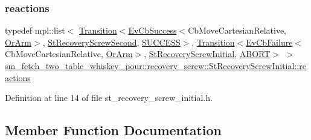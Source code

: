 \subsubsection{\texorpdfstring{reactions}{reactions}}
{\footnotesize\ttfamily typedef mpl\+::list$<$ \hyperlink{classsmacc_1_1Transition}{Transition}$<$\hyperlink{structsmacc_1_1EvCbSuccess}{Ev\+Cb\+Success}$<$Cb\+Move\+Cartesian\+Relative, \hyperlink{classsm__fetch__two__table__whiskey__pour_1_1OrArm}{Or\+Arm}$>$, \hyperlink{structsm__fetch__two__table__whiskey__pour_1_1recovery__screw_1_1StRecoveryScrewSecond}{St\+Recovery\+Screw\+Second}, \hyperlink{structsmacc_1_1default__transition__tags_1_1SUCCESS}{S\+U\+C\+C\+E\+SS}$>$, \hyperlink{classsmacc_1_1Transition}{Transition}$<$\hyperlink{structsmacc_1_1EvCbFailure}{Ev\+Cb\+Failure}$<$Cb\+Move\+Cartesian\+Relative, \hyperlink{classsm__fetch__two__table__whiskey__pour_1_1OrArm}{Or\+Arm}$>$, \hyperlink{structsm__fetch__two__table__whiskey__pour_1_1recovery__screw_1_1StRecoveryScrewInitial}{St\+Recovery\+Screw\+Initial}, \hyperlink{structsmacc_1_1default__transition__tags_1_1ABORT}{A\+B\+O\+RT}$>$ $>$ \hyperlink{structsm__fetch__two__table__whiskey__pour_1_1recovery__screw_1_1StRecoveryScrewInitial_a560bddc35c9e663c398c1b7152cc505d}{sm\+\_\+fetch\+\_\+two\+\_\+table\+\_\+whiskey\+\_\+pour\+::recovery\+\_\+screw\+::\+St\+Recovery\+Screw\+Initial\+::reactions}}



Definition at line 14 of file st\+\_\+recovery\+\_\+screw\+\_\+initial.\+h.



\subsection{Member Function Documentation}
\mbox{\label{structsm__fetch__two__table__whiskey__pour_1_1recovery__screw_1_1StRecoveryScrewInitial_a217246edfa5c9509a8cc7061bbfceca4}} 
